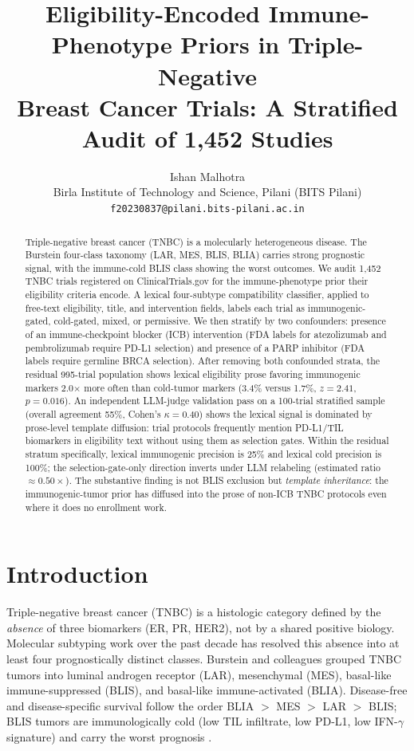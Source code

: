 \documentclass{article}
\title{Eligibility-Encoded Immune-Phenotype Priors in Triple-Negative \\
       Breast Cancer Trials: A Stratified Audit of 1{,}452 Studies}
\author{%
  Ishan Malhotra \\
  Birla Institute of Technology and Science, Pilani (BITS Pilani) \\
  \texttt{f20230837@pilani.bits-pilani.ac.in}
}
\begin{document}
\maketitle

\begin{abstract}
Triple-negative breast cancer (TNBC) is a molecularly heterogeneous disease.
The Burstein four-class taxonomy (LAR, MES, BLIS, BLIA) carries strong
prognostic signal, with the immune-cold BLIS class showing the worst
outcomes.  We audit 1{,}452 TNBC trials registered on ClinicalTrials.gov for
the immune-phenotype prior their eligibility criteria encode.  A lexical
four-subtype compatibility classifier, applied to free-text eligibility,
title, and intervention fields, labels each trial as immunogenic-gated,
cold-gated, mixed, or permissive.  We then stratify by two confounders:
presence of an immune-checkpoint blocker (ICB) intervention (FDA labels
for atezolizumab and pembrolizumab require PD-L1 selection) and presence
of a PARP inhibitor (FDA labels require germline BRCA selection).  After
removing both confounded strata, the residual 995-trial population shows
lexical eligibility prose favoring immunogenic markers 2.0$\times$ more
often than cold-tumor markers (3.4\% versus 1.7\%, $z=2.41$, $p=0.016$).
An independent LLM-judge validation pass on a 100-trial stratified sample
(overall agreement 55\%, Cohen's $\kappa=0.40$) shows the lexical signal
is dominated by prose-level template diffusion: trial protocols
frequently mention PD-L1/TIL biomarkers in eligibility text without using
them as selection gates.  Within the residual stratum specifically,
lexical immunogenic precision is 25\% and lexical cold precision is
100\%; the selection-gate-only direction inverts under LLM relabeling
(estimated ratio $\approx 0.50\times$).  The substantive finding is not
BLIS exclusion but \emph{template inheritance}: the immunogenic-tumor
prior has diffused into the prose of non-ICB TNBC protocols even where
it does no enrollment work.
\end{abstract}

\section{Introduction}
\label{sec:intro}

Triple-negative breast cancer (TNBC) is a histologic category defined by
the \emph{absence} of three biomarkers (ER, PR, HER2), not by a shared
positive biology.  Molecular subtyping work over the past decade has
resolved this absence into at least four prognostically distinct
classes.  Burstein and colleagues \cite{burstein2015} grouped TNBC
tumors into luminal androgen receptor (LAR), mesenchymal (MES),
basal-like immune-suppressed (BLIS), and basal-like immune-activated
(BLIA).  Disease-free and disease-specific survival follow the order
BLIA $>$ MES $>$ LAR $>$ BLIS; BLIS tumors are immunologically cold
(low TIL infiltrate, low PD-L1, low IFN-$\gamma$ signature) and carry
the worst prognosis \cite{burstein2015,hossain2021}.
\end{document}
